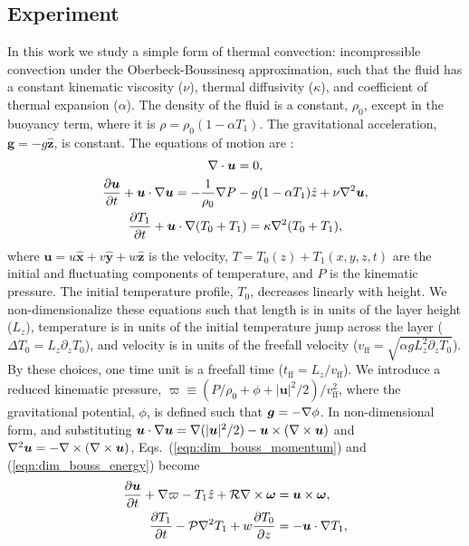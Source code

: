\subsection{Experiment}
\label{sec:abo18_experiment}
In this work we study a simple form of thermal convection: incompressible \RB convection under the Oberbeck-Boussinesq approximation, such that the fluid has a constant kinematic viscosity ($\nu$), thermal diffusivity ($\kappa$), and coefficient of thermal expansion ($\alpha$). 
The density of the fluid is a constant, $\rho_0$, except in the buoyancy term, where it is $\rho = \rho_0(1  - \alpha T_1)$.
The gravitational acceleration, $\bm{g} = - g\bm{\hat{z}}$, is constant.
The equations of motion are \cite{spiegel&veronis1960}:
\begin{gather}
\nabla\cdot\bm{u} = 0, 
	\label{eqn:incompressible}
\\
\frac{\partial \bm{u}}{\partial t} + \bm{u}\cdot\nabla\bm{u} =
-\frac{1}{\rho_0}\nabla P - g( 1 - \alpha T_1)\hat{z} + \nu\nabla^2\bm{u}, 
	\label{eqn:dim_bouss_momentum}
\\
\frac{\partial T_1}{\partial t} + \bm{u}\cdot\nabla(T_0 + T_1) = \kappa\nabla^2 (T_0 + T_1),
	\label{eqn:dim_bouss_energy}
\end{gather}
where $\bm{u} = u\bm{\hat{x}} + v\bm{\hat{y}} + w\bm{\hat{z}}$ is the velocity, $T = T_0(z) + T_1(x, y, z, t)$ are the initial and fluctuating components of temperature, and $P$ is the kinematic pressure. 
The initial temperature profile, $T_0$, decreases linearly with height.
We non-dimensionalize these equations such that length is in units of the layer height ($L_z$), temperature is in units of the initial temperature jump across the layer ($\Delta T_0 = L_z \partial_z T_0$), and velocity is in units of the freefall velocity ($v_{\text{ff}} = \sqrt{\alpha g L_z^2 \partial_z T_0}$).
By these choices, one time unit is a freefall time ($t_{\text{ff}} = L_z/v_{\text{ff}}$).
We introduce a reduced kinematic pressure, $\varpi \equiv (P / \rho_0 + \phi + |\bm{u}|^2 / 2) / v_{\text{ff}}^2$, where the gravitational potential, $\phi$, is defined such that $\bm{g} = -\nabla \phi$. 
In non-dimensional form, and substituting $\bm{u}\cdot\nabla\bm{u} = \nabla(|\bm{u}|^2/2) - \bm{u}\times(\nabla\times\bm{u})$ and $\nabla^2\bm{u} = -\nabla\times(\nabla\times\bm{u})$, Eqs.~(\ref{eqn:dim_bouss_momentum}) and (\ref{eqn:dim_bouss_energy}) become 
\begin{align}
\frac{\partial \bm{u}}{\partial t} + \nabla \varpi - T_1\hat{z} + \mathcal{R}\nabla\times\bm{\omega} &= \bm{u}\times\bm{\omega},
	\label{eqn:bouss_momentum}
\\
\frac{\partial T_1}{\partial t} - \mathcal{P}\nabla^2 T_1 + w \frac{\partial T_0}{\partial z} &= - \bm{u}\cdot\nabla T_1,
	\label{eqn:bouss_energy}
\end{align}
